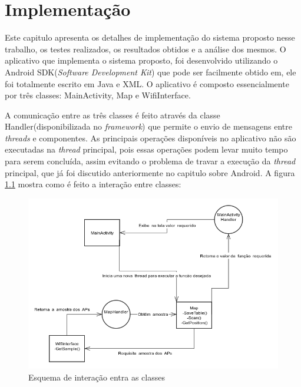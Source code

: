 \chapter{Implementação}	 
\label{implementacao}
  Este capitulo apresenta os detalhes de implementação do sistema proposto nesse trabalho, os testes realizados, os resultados obtidos 
  e a análise dos mesmos.
  O aplicativo que implementa o sistema proposto, foi desenvolvido utilizando o Android SDK(\textit{Software Development Kit}) que pode ser 
  facilmente obtido em\cite{sdk}, 
  ele foi totalmente escrito em Java e XML. O aplicativo é composto essencialmente por três  classes: MainActivity, 
  Map e WifiInterface. 
  
  A comunicação entre as três classes é feito através da classe Handler\cite{handler}(disponibilizada no \textit{framework}) que permite o envio de 
  mensagens entre \textit{threads} e componentes. As principais operações disponíveis no aplicativo não 
  são executadas na \textit{thread} principal, pois essas operações podem levar muito tempo para serem 
  concluída, assim evitando o problema de travar a execução da \textit{thread} principal, 
  que já foi discutido anteriormente no capitulo sobre Android.
   \clearpage
  A figura \ref{fig:appSchema} mostra como é feito a interação entre classes:
  \begin{figure}[hbt]
  \centering
  \includegraphics[scale=0.6]{images/apptg.png}
  \caption{Esquema de interação entra as classes}
  \label{fig:appSchema}
  \end{figure}

